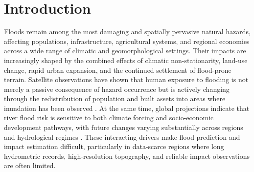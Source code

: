 \documentclass[pdflatex,sn-mathphys-ay]{sn-jnl}
\theoremstyle{thmstyleone}
\theoremstyle{thmstylethree}
\theoremstyle{thmstyletwo}
\begin{document}


\maketitle

\section{Introduction}
\label{sec:intro}

Floods remain among the most damaging and spatially pervasive natural
hazards, affecting populations, infrastructure, agricultural systems,
and regional economies across a wide range of climatic and
geomorphological settings.  Their impacts are increasingly shaped by
the combined effects of climatic non-stationarity, land-use change,
rapid urban expansion, and the continued settlement of flood-prone
terrain.  Satellite observations have shown that human exposure to
flooding is not merely a passive consequence of hazard occurrence but
is actively changing through the redistribution of population and built
assets into areas where inundation has been observed
\citep{Tellman2021}.  At the same time, global projections indicate
that river flood risk is sensitive to both climate forcing and
socio-economic development pathways, with future changes varying
substantially across regions and hydrological regimes
\citep{Hirabayashi2013,Winsemius2016,Alfieri2016}.  These interacting
drivers make flood prediction and impact estimation difficult,
particularly in data-scarce regions where long hydrometric records,
high-resolution topography, and reliable impact observations are often
limited.
\end{document}
